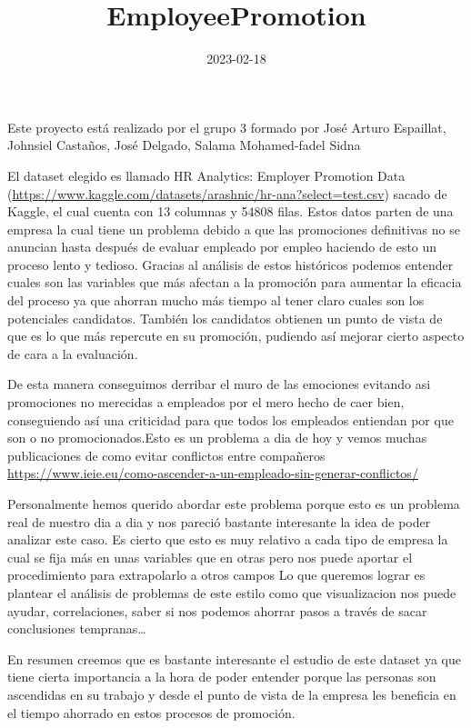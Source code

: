 \documentclass[
]{article}
\title{EmployeePromotion}
\author{}
\date{\vspace{-2.5em}2023-02-18}
\begin{document}
\maketitle

Este proyecto está realizado por el grupo 3 formado por José Arturo
Espaillat, Johnsiel Castaños, José Delgado, Salama Mohamed-fadel Sidna

El dataset elegido es llamado HR Analytics: Employer Promotion Data
(\url{https://www.kaggle.com/datasets/arashnic/hr-ana?select=test.csv})
sacado de Kaggle, el cual cuenta con 13 columnas y 54808 filas. Estos
datos parten de una empresa la cual tiene un problema debido a que las
promociones definitivas no se anuncian hasta después de evaluar empleado
por empleo haciendo de esto un proceso lento y tedioso. Gracias al
análisis de estos históricos podemos entender cuales son las variables
que más afectan a la promoción para aumentar la eficacia del proceso ya
que ahorran mucho más tiempo al tener claro cuales son los potenciales
candidatos. También los candidatos obtienen un punto de vista de que es
lo que más repercute en su promoción, pudiendo así mejorar cierto
aspecto de cara a la evaluación.

De esta manera conseguimos derribar el muro de las emociones evitando
asi promociones no merecidas a empleados por el mero hecho de caer bien,
conseguiendo así una criticidad para que todos los empleados entiendan
por que son o no promocionados.Esto es un problema a dia de hoy y vemos
muchas publicaciones de como evitar conflictos entre compañeros
\url{https://www.ieie.eu/como-ascender-a-un-empleado-sin-generar-conflictos/}

Personalmente hemos querido abordar este problema porque esto es un
problema real de nuestro dia a dia y nos pareció bastante interesante la
idea de poder analizar este caso. Es cierto que esto es muy relativo a
cada tipo de empresa la cual se fija más en unas variables que en otras
pero nos puede aportar el procedimiento para extrapolarlo a otros campos
Lo que queremos lograr es plantear el análisis de problemas de este
estilo como que visualizacion nos puede ayudar, correlaciones, saber si
nos podemos ahorrar pasos a través de sacar conclusiones
tempranas\ldots{}

En resumen creemos que es bastante interesante el estudio de este
dataset ya que tiene cierta importancia a la hora de poder entender
porque las personas son ascendidas en su trabajo y desde el punto de
vista de la empresa les beneficia en el tiempo ahorrado en estos
procesos de promoción.
\end{document}
